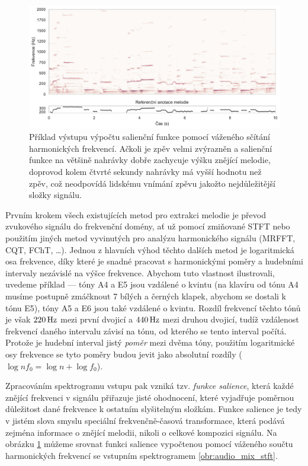 \begin{figure}[h]\centering
\includegraphics[width=\textwidth,height=\textheight,keepaspectratio]{../img/salience}
\caption{Příklad výstupu výpočtu salienční funkce pomocí váženého sčítání harmonických frekvencí. Ačkoli je zpěv velmi zvýrazněn a salienční funkce na většině nahrávky dobře zachycuje výšku znějící melodie, doprovod kolem čtvrté sekundy nahrávky má vyšší hodnotu než zpěv, což neodpovídá lidskému vnímání zpěvu jakožto nejdůležitější složky signálu.}
\label{obr:salience}
\end{figure}

Prvním krokem všech existujících metod pro extrakci melodie je převod zvukového signálu do frekvenční domény, ať už pomocí zmiňované STFT nebo použitím jiných metod vyvinutých pro analýzu harmonického signálu (MRFFT, CQT, FChT, \dots). Jednou z hlavních výhod těchto dalších metod je logaritmická osa frekvence, díky které je snadné pracovat s harmonickými poměry a hudebními intervaly nezávislé na výšce frekvence. Abychom tuto vlastnost ilustrovali, uvedeme příklad --- tóny A4 a E5 jsou vzdálené o kvintu (na klavíru od tónu A4 musíme postupně zmáčknout 7 bílých a černých klapek, abychom se dostali k tónu E5), tóny A5 a E6 jsou také vzdálené o kvintu. Rozdíl frekvencí těchto tónů je však $220\,\rm Hz$ mezi první dvojicí a $440\,\rm Hz$ mezi druhou dvojicí, tudíž vzdálenost frekvencí daného intervalu závisí na tónu, od kterého se tento interval počítá. Protože je hudební interval jistý \emph{poměr} mezi dvěma tóny, použitím logaritmické osy frekvence se tyto poměry budou jevit jako absolutní rozdíly ($\log n f_0 = \log n + \log f_0$). 

Zpracováním spektrogramu vstupu pak vzniká tzv. \emph{funkce salience}, která každé znějící frekvenci v signálu přiřazuje jisté ohodnocení, které vyjadřuje poměrnou důležitost dané frekvence k ostatním slyšitelným složkám. Funkce salience je tedy v jistém slova smyslu speciální frekvenčně-časová transformace, která podává zejména informace o znějící melodii, nikoli o celkové kompozici signálu. Na obrázku \ref{obr:salience} můžeme srovnat funkci salience vypočtenou pomocí váženého součtu harmonických frekvencí se vstupním spektrogramem \ref{obr:audio_mix_stft}.


